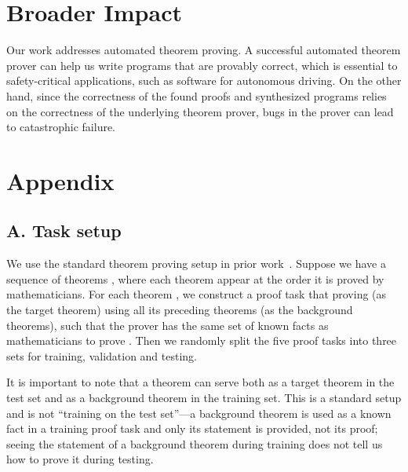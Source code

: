 \documentclass{article}
\begin{document}
\section*{Broader Impact}
Our work addresses automated theorem proving. 
A successful automated theorem prover can help us write programs that are provably correct, which is essential to safety-critical applications, such as software for autonomous driving. On the other hand, since the correctness of the found proofs and synthesized programs relies on the correctness of the underlying theorem prover, bugs in the prover can lead to catastrophic failure. 




\section*{Appendix}

\subsection*{A. Task setup}
We use the standard theorem proving setup in prior work~\cite{irving2016deepmath,bansal2019holist, whalen2016holophrasm}.
Suppose we have a sequence of theorems , where each theorem appear at the order it is proved by mathematicians. For each theorem , we construct a proof task
that proving  (as the target theorem) using all its preceding theorems  (as the background theorems), such that the prover has the same set of known facts as mathematicians to prove . Then we randomly split the five proof tasks into three sets for training, validation and testing.

It is important to note that a theorem can serve both as a target theorem in the test set and as a background theorem in the training set. This is a standard setup and is not ``training on the test set''---a background theorem is used as a known fact in a training proof task and only its statement is provided, not its proof; seeing the statement of a background theorem during training does not tell us how to prove it during testing. 
\end{document}
